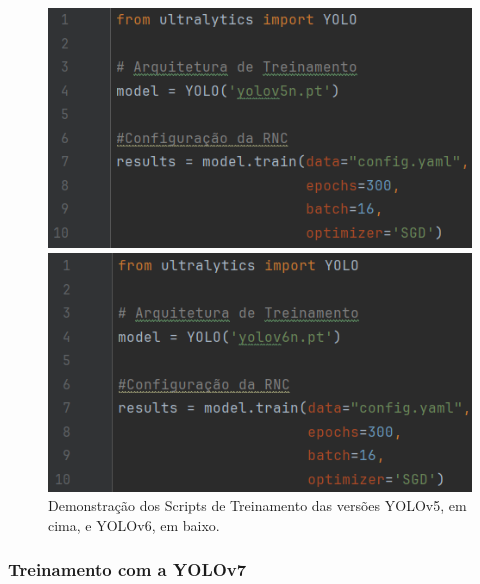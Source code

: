 \begin{figure}[!h]
    \centering
    \begin{minipage}[b]{0.49\linewidth}
        \centering
        \includegraphics[width=1\linewidth]{img/cap5/script-yolov5.png}
    \end{minipage}
    \hspace{0.05\linewidth}
    \begin{minipage}[b]{0.49\linewidth}
        \centering
        \includegraphics[width=1\linewidth]{img/cap5/script-yolov6.png}
    \end{minipage}
    \captionsetup{justification=centering,margin=0.5cm,font=small}
    \caption{Demonstração dos Scripts de Treinamento das versões YOLOv5, em cima, e YOLOv6, em baixo.}
    \label{fig:script-yolov5-6}
\end{figure}

\subsubsection{Treinamento com a YOLOv7}

